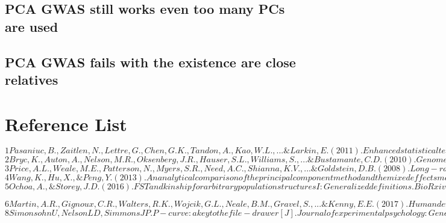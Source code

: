 \documentclass[12pt]{article}
\theoremstyle{definition}
\theoremstyle{plain}
\begin{document}
\subsection{PCA GWAS still works even too many PCs are used}

\subsection{PCA GWAS fails with the existence are close relatives }



\section{Reference List}
$
1
Pasaniuc, B., Zaitlen, N., Lettre, G., Chen, G. K., Tandon, A., Kao, W. L., ... \& Larkin, E. (2011). Enhanced statistical tests for GWAS in admixed populations: assessment using African Americans from CARe and a Breast Cancer Consortium. PLoS genetics, 7(4), e1001371.
$\\

$
2
Bryc, K., Auton, A., Nelson, M. R., Oksenberg, J. R., Hauser, S. L., Williams, S., ... \& Bustamante, C. D. (2010). Genome-wide patterns of population structure and admixture in West Africans and African Americans. Proceedings of the National Academy of Sciences, 107(2), 786-791.
$\\

$
3
Price, A. L., Weale, M. E., Patterson, N., Myers, S. R., Need, A. C., Shianna, K. V., ... \& Goldstein, D. B. (2008). Long-range LD can confound genome scans in admixed populations. The American Journal of Human Genetics, 83(1), 132-135.
$\\

$
4
Wang, K., Hu, X., \& Peng, Y. (2013). An analytical comparison of the principal component method and the mixed effects model for association studies in the presence of cryptic relatedness and population stratification. Human heredity, 76(1), 1-9.
$\\



$
5
Ochoa, A., \& Storey, J. D. (2016). FST and kinship for arbitrary population structures I: Generalized definitions. BioRxiv, 083915.
$

$
6
Martin, A. R., Gignoux, C. R., Walters, R. K., Wojcik, G. L., Neale, B. M., Gravel, S., ... \& Kenny, E. E. (2017). Human demographic history impacts genetic risk prediction across diverse populations. The American Journal of Human Genetics, 100(4), 635-649.
$\\



$
8
Simonsohn U, Nelson L D, Simmons J P. P-curve: a key to the file-drawer[J]. Journal of experimental psychology: General, 2014, 143(2): 534.
$
\end{document}
